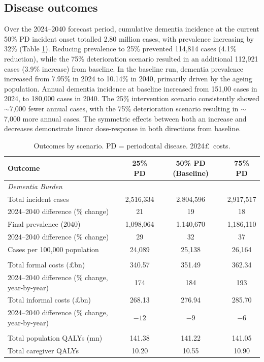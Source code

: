 \documentclass[11pt,a4paper]{article}
\begin{document}
\subsection{Disease outcomes}

Over the 2024--2040 forecast period, cumulative dementia incidence at the current 50\% PD incident onset totalled 2.80 million cases, with prevalence increasing by 32\% (Table \ref{tab:outcomes}). Reducing prevalence to 25\% prevented 114,814 cases (4.1\% reduction), while the 75\% deterioration scenario resulted in an additional 112,921 cases (3.9\% increase) from baseline. In the baseline run, dementia prevalence increased from 7.95\% in 2024 to 10.14\% in 2040, primarily driven by the ageing population. Annual dementia incidence at baseline increased from 151,00 cases in 2024, to 180,000 cases in 2040. The 25\% intervention scenario consistently showed $\sim$7,000 fewer annual cases, with the 75\% deterioration scenario resulting in $\sim$7,000 more annual cases. The symmetric effects between both an increase and decreases demonstrate linear dose-response in both directions from baseline.

\begin{table}[htbp]
\centering
\caption{Outcomes by scenario. PD = periodontal disease. 2024\pounds\ costs.}
\label{tab:outcomes}
\small
\begin{tabular}{lccc}
\toprule
\textbf{Outcome} & \textbf{25\% PD} & \textbf{50\% PD (Baseline)} & \textbf{75\% PD} \\
\midrule
\multicolumn{4}{l}{\textit{Dementia Burden}} \\
Total incident cases & 2,516,334 & 2,804,596 & 2,917,517 \\
2024--2040 difference (\% change) & 21 & 19 & 18 \\
Final prevalence (2040) & 1,098,064 & 1,140,670 & 1,186,110 \\
2024--2040 difference (\% change) & 29 & 32 & 37 \\
Cases per 100,000 population & 24,089 & 25,138 & 26,164 \\
\addlinespace
\multicolumn{4}{l}{\textit{Economic Outcomes}} \\
Total formal costs (\pounds bn) & 340.57 & 351.49 & 362.34 \\
2024--2040 difference (\% change, year-by-year) & 174 & 184 & 193 \\
Total informal costs (\pounds bn) & 268.13 & 276.94 & 285.70 \\
2024--2040 difference (\% change, year-by-year) & $-12$ & $-9$ & $-6$ \\
\addlinespace
\multicolumn{4}{l}{\textit{Health Utilities}} \\
Total population QALYs (mn) & 141.38 & 141.22 & 141.05 \\
Total caregiver QALYs & 10.20 & 10.55 & 10.90 \\
\bottomrule
\end{tabular}
\end{table}
\end{document}
